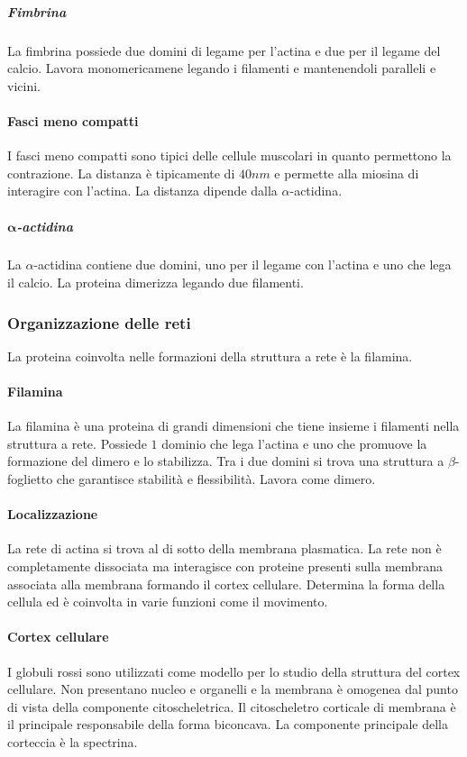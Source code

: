 				\subparagraph{Fimbrina}
				La fimbrina possiede due domini di legame per l'actina e due per il legame del calcio.
				Lavora monomericamene legando i filamenti e mantenendoli paralleli e vicini.

			\paragraph{Fasci meno compatti}
			I fasci meno compatti sono tipici delle cellule muscolari in quanto permettono la contrazione.
			La distanza \`e tipicamente di $40nm$ e permette alla miosina di interagire con l'actina.
			La distanza dipende dalla $\alpha$-actidina.

				\subparagraph{$\mathbf{\alpha}$-actidina}
				La $\alpha$-actidina contiene due domini, uno per il legame con l'actina e uno che lega il calcio.
				La proteina dimerizza legando due filamenti.

		\subsubsection{Organizzazione delle reti}
		La proteina coinvolta nelle formazioni della struttura a rete \`e la filamina.
		
			\paragraph{Filamina}
			La filamina \`e una proteina di grandi dimensioni che tiene insieme i filamenti nella struttura a rete.
			Possiede $1$ dominio che lega l'actina e uno che promuove la formazione del dimero e lo stabilizza.
			Tra i due domini si trova una struttura a $\beta$-foglietto che garantisce stabilit\`a e flessibilit\`a.
			Lavora come dimero.

			\paragraph{Localizzazione}
			La rete di actina si trova al di sotto della membrana plasmatica.
			La rete non \`e completamente dissociata ma interagisce con proteine presenti sulla membrana associata alla membrana formando il cortex cellulare.
			Determina la forma della cellula ed \`e coinvolta in varie funzioni come il movimento.

			\paragraph{Cortex cellulare}
			I globuli rossi sono utilizzati come modello per lo studio della struttura del cortex cellulare.
			Non presentano nucleo e organelli e la membrana \`e omogenea dal punto di vista della componente citoscheletrica.
			Il citoscheletro corticale di membrana \`e il principale responsabile della forma biconcava.
			La componente principale della corteccia \`e la spectrina.

